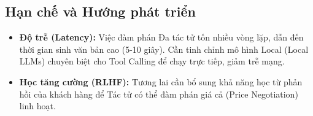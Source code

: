 \subsection{Hạn chế và Hướng phát triển}
\begin{itemize}
    \item \textbf{Độ trễ (Latency):} Việc đàm phán Đa tác tử tốn nhiều vòng lặp, dẫn đến thời gian sinh văn bản cao (5-10 giây). Cần tinh chỉnh mô hình Local (Local LLMs) chuyên biệt cho Tool Calling để chạy trực tiếp, giảm trễ mạng.
    \item \textbf{Học tăng cường (RLHF):} Tương lai cần bổ sung khả năng học từ phản hồi của khách hàng để Tác tử có thể đàm phán giá cả (Price Negotiation) linh hoạt.
\end{itemize}
